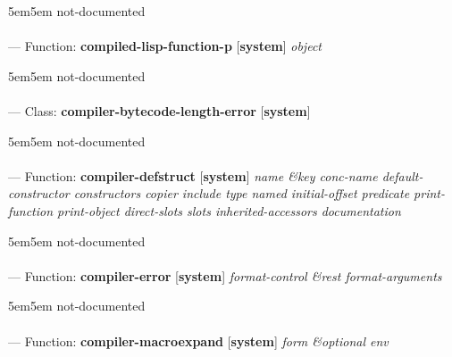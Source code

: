 \begin{adjustwidth}{5em}{5em}
not-documented
\end{adjustwidth}

\paragraph{}
\label{SYSTEM:COMPILED-LISP-FUNCTION-P}
--- Function: \textbf{compiled-lisp-function-p} [\textbf{system}] \textit{object}

\begin{adjustwidth}{5em}{5em}
not-documented
\end{adjustwidth}

\paragraph{}
\label{SYSTEM:COMPILER-BYTECODE-LENGTH-ERROR}
--- Class: \textbf{compiler-bytecode-length-error} [\textbf{system}] \textit{}

\begin{adjustwidth}{5em}{5em}
not-documented
\end{adjustwidth}

\paragraph{}
\label{SYSTEM:COMPILER-DEFSTRUCT}
--- Function: \textbf{compiler-defstruct} [\textbf{system}] \textit{name \&key conc-name default-constructor constructors copier include type named initial-offset predicate print-function print-object direct-slots slots inherited-accessors documentation}

\begin{adjustwidth}{5em}{5em}
not-documented
\end{adjustwidth}

\paragraph{}
\label{SYSTEM:COMPILER-ERROR}
--- Function: \textbf{compiler-error} [\textbf{system}] \textit{format-control \&rest format-arguments}

\begin{adjustwidth}{5em}{5em}
not-documented
\end{adjustwidth}

\paragraph{}
\label{SYSTEM:COMPILER-MACROEXPAND}
--- Function: \textbf{compiler-macroexpand} [\textbf{system}] \textit{form \&optional env}

